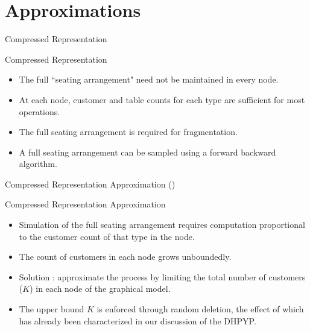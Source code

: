 \documentclass{beamer}
\begin{document}
\section{Approximations}

\begin{frame}[t]{Compressed Representation}
	
	\begin{block}{Compressed Representation \cite{Gasthaus2011}}
		\begin{itemize}
			\item The full ``seating arrangement" need not be maintained in every node.
			\item At each node, customer and table counts for each type are sufficient for most operations.
			\item The full seating arrangement is required for fragmentation.
			\item A full seating arrangement can be sampled using a forward backward algorithm.
		\end{itemize}
	\end{block}
	
\end{frame}

\begin{frame}[t]{Compressed Representation Approximation  (\citet{Bartlett2011})}
	
	\begin{block}{Compressed Representation Approximation}
		\begin{itemize}
			\item Simulation of the full seating arrangement requires computation proportional to the customer count of that type in the node.
			\item The count of customers in each node grows unboundedly.
			\item Solution : approximate the process by limiting the total number of customers ($K$) in each node of the graphical model.
			\item The upper bound $K$ is enforced through random deletion, the effect of which has already been characterized in our discussion of the DHPYP.
		\end{itemize}
	\end{block}
	
\end{frame}
\end{document}
